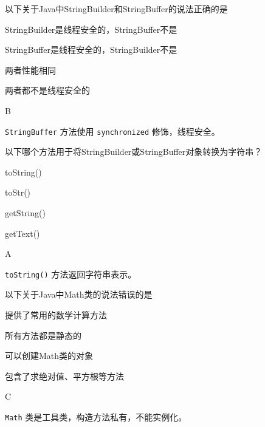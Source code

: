 \begin{question}
	以下关于Java中StringBuilder和StringBuffer的说法正确的是
	\begin{options}
		\item StringBuilder是线程安全的，StringBuffer不是
		\item StringBuffer是线程安全的，StringBuilder不是
		\item 两者性能相同
		\item 两者都不是线程安全的
	\end{options}
	\begin{answer}
		B
	\end{answer}
	\begin{explanation}
		\texttt{StringBuffer} 方法使用 \texttt{synchronized} 修饰，线程安全。
	\end{explanation}
\end{question}

\begin{question}
	以下哪个方法用于将StringBuilder或StringBuffer对象转换为字符串？
	\begin{options}
		\item toString()
		\item toStr()
		\item getString()
		\item getText()
	\end{options}
	\begin{answer}
		A
	\end{answer}
	\begin{explanation}
		\texttt{toString()} 方法返回字符串表示。
	\end{explanation}
\end{question}

\begin{question}
	以下关于Java中Math类的说法错误的是
	\begin{options}
		\item 提供了常用的数学计算方法
		\item 所有方法都是静态的
		\item 可以创建Math类的对象
		\item 包含了求绝对值、平方根等方法
	\end{options}
	\begin{answer}
		C
	\end{answer}
	\begin{explanation}
		\texttt{Math} 类是工具类，构造方法私有，不能实例化。
	\end{explanation}
\end{question}

